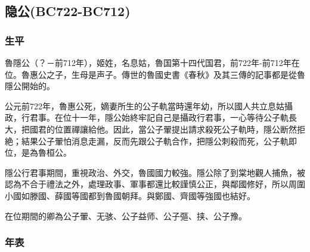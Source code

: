 
\subsection{隐公{\tiny(BC722-BC712)}}

\subsubsection{生平}

魯隱公（？－前712年），姬姓，名息姑，魯国第十四代国君，前722年-前712年在位。魯惠公之子，生母是声子。傳世的魯國史書《春秋》及其三傳的記事都是從魯隱公開始的。

公元前722年，魯惠公死，嫡妻所生的公子軌當時還年幼，所以國人共立息姑攝政，行君事。在位十一年，隱公始終牢記自己是攝政行君事，一心等待公子軌長大，把國君的位置禪讓給他。因此，當公子翬提出請求殺死公子軌時，隱公断然拒絶；結果公子翬怕消息走漏，反而先跟公子軌合作，把隱公刺殺而死，公子軌即位，是為魯桓公。

隱公行君事期間，重視政治、外交，魯國國力較強。隱公除了到棠地觀人捕魚，被認為不合于禮法之外，處理政事、軍事都還比較謹慎公正，與鄰國修好，所以周圍小國如滕國、薛國等國都到魯國朝拜。與鄭國、齊國等強國也結好。

在位期間的卿為公子翬、无骇、公子益师、公子彄、挟、公子豫。

\subsubsection{年表}

